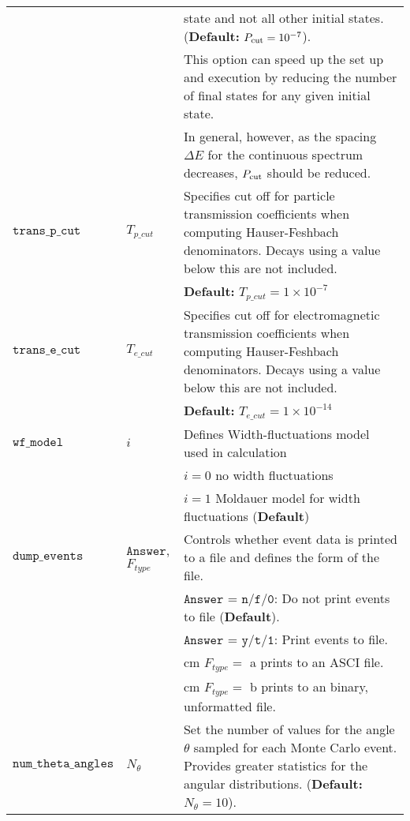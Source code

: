 \documentclass[
10pt,
showpacs,preprintnumbers,footinbib,
amsfonts,amsmath,amssymb,
aps,
prc,twocolumn,groupedaddress,superscriptaddress,
showkeys,
nofootinbib
]{revtex4-1}
\begin{document}
\begin{center}
\begin{tabular}{| p{4cm} | p{4cm} | p{9cm} |}
 & &    state and not all other initial states. ({\bf Default:} $P_{\rm cut} = 10^{-7}$).\\
 & & This option can speed up the set up and execution by reducing the number of final states for any given initial state.\\
 & & In general, however, as the spacing $\Delta E$ for the continuous spectrum decreases, $P_{\rm cut}$ should be reduced.\\
\hline
${\texttt{trans\_p\_cut}}$ & $T_{p\_cut}$ & Specifies cut off for particle transmission coefficients when computing Hauser-Feshbach denominators. Decays using a value below this are not included.\\
& & {\bf Default:} $T_{p\_cut} = 1\times 10^{-7}$\\
\hline
${\texttt{trans\_e\_cut}}$ & $T_{e\_cut}$ & Specifies cut off for electromagnetic transmission coefficients when computing Hauser-Feshbach denominators. Decays using a value below this are not included.\\
& & {\bf Default:} $T_{e\_cut} = 1\times 10^{-14}$\\
\hline
${\texttt{wf\_model}}$  & $i$ &    Defines Width-fluctuations model used in calculation \\
& &    $i = 0$ no width fluctuations\\
& &    $i = 1$ Moldauer model for width fluctuations ({\bf Default})\\
\hline
${\texttt{dump\_events}}$ & ${\texttt{Answer}}$, $F_{type}$ & Controls whether event data is printed to a file and defines the form of the file.\\
& & ${\texttt{Answer}}$ = ${\texttt{n/f/0}}$: Do not print events to file ({\bf Default}).\\
& & ${\texttt{Answer}}$ = ${\texttt{y/t/1}}$: Print events to file.\\
& & \hskip 1.2 cm $F_{type} =$ a prints to an ASCI file.\\
& & \hskip 1.2 cm $F_{type} =$ b prints to an binary, unformatted file.\\
\hline
${\texttt{num\_theta\_angles}}$  & $N_\theta$ &   Set the number of values for the angle $\theta$ sampled for each Monte Carlo event. Provides greater statistics for the angular distributions. ({\bf Default:} $N_\theta = 10$).\\
\hline
\end{tabular}
\end{center}
\end{document}
